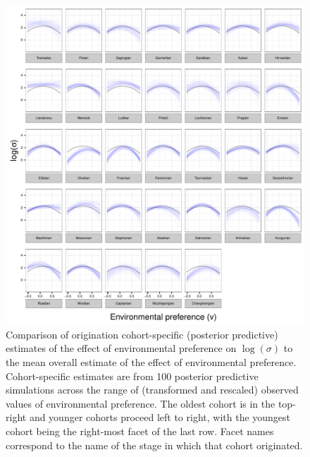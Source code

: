 \documentclass{article}
\begin{document}
\begin{figure}[ht]
  \centering
  \includegraphics[width = \textwidth,height = 0.8\textheight,keepaspectratio=true]{figure/env_cohort}
  \caption{Comparison of origination cohort-specific (posterior predictive) estimates of the effect of environmental preference on \(\log(\sigma)\) to the mean overall estimate of the effect of environmental preference. Cohort-specific estimates are from 100 posterior predictive simulations across the range of (transformed and rescaled) observed values of environmental preference. The oldest cohort is in the top-right and younger cohorts proceed left to right, with the youngest cohort being the right-most facet of the last row. Facet names correspond to the name of the stage in which that cohort originated.}
  \label{fig:env_cohort}
\end{figure}
\end{document}
